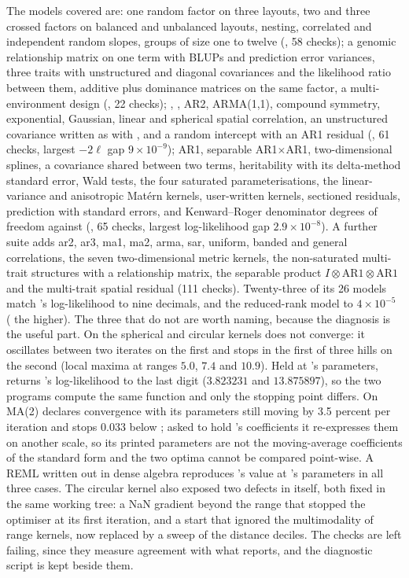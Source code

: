 The models covered are: one random factor on three layouts, two and three
crossed factors on balanced and unbalanced layouts, nesting, correlated and
independent random slopes, groups of size one to twelve (, 58
checks); a genomic relationship matrix on one term with BLUPs and prediction
error variances, three traits with unstructured and diagonal covariances and
the likelihood ratio between them, additive plus dominance matrices on the
same factor, a multi-environment design (, 22 checks);
, , AR2, ARMA(1,1), compound symmetry,
exponential, Gaussian, linear and spherical spatial correlation, an
unstructured covariance written as  with , and a
random intercept with an AR1 residual (, 61 checks, largest
$-2\ell$ gap $9 \times 10^{-9}$); AR1, separable AR1$\times$AR1, two-dimensional
splines, a covariance shared between two terms, heritability with its
delta-method standard error, Wald tests, the four saturated
parameterisations, the linear-variance and anisotropic Mat\'ern kernels,
user-written kernels, sectioned residuals, prediction with standard errors,
and Kenward--Roger denominator degrees of freedom against 
(, 65 checks, largest log-likelihood gap $2.9 \times 10^{-8}$).
A further suite adds ar2, ar3, ma1, ma2, arma, sar, uniform, banded and
general correlations, the seven two-dimensional metric kernels, the
non-saturated multi-trait structures with a relationship matrix, the
separable product $I \otimes \mathrm{AR1} \otimes \mathrm{AR1}$ and the
multi-trait spatial residual (111 checks). Twenty-three of its 26 models
match 's log-likelihood to nine decimals, and the reduced-rank
model to $4 \times 10^{-5}$ ( the higher). The three that do not are worth naming, because the diagnosis is the
useful part. On the spherical and circular kernels  does not
converge: it oscillates between two iterates on the first and stops in the
first of three hills on the second (local maxima at ranges $5.0$, $7.4$ and
$10.9$). Held at 's parameters,  returns
's log-likelihood to the last digit ($3.823231$ and
$13.875897$), so the two programs compute the same function and only the
stopping point differs. On MA(2)  declares convergence with its
parameters still moving by 3.5 percent per iteration and stops $0.033$ below
; asked to hold 's coefficients it re-expresses
them on another scale, so its printed parameters are not the moving-average
coefficients of the standard form and the two optima cannot be compared
point-wise. A REML written out in dense algebra reproduces 's
value at 's parameters in all three cases. The circular kernel
also exposed two defects in  itself, both fixed in the same
working tree: a NaN gradient beyond the range that stopped the optimiser at
its first iteration, and a start that ignored the multimodality of range
kernels, now replaced by a sweep of the distance deciles. The checks are left
failing, since they measure agreement with what  reports, and
the diagnostic script is kept beside them.

